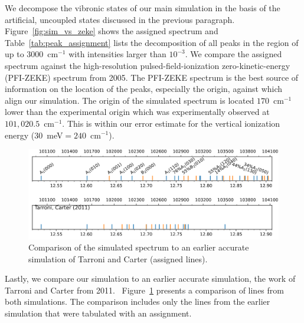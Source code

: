 \documentclass[12pt,a4paper,prb,aps,superscriptaddress]{revtex4}
\begin{document}
We decompose the vibronic states of our main simulation in the basis of the
artificial, uncoupled states discussed in the previous paragraph.
Figure~\ref{fig:sim_vs_zeke} shows the assigned spectrum and
Table~\ref{tab:peak_assignment} lists the decomposition of all peaks in the
region of up to $3000$~cm$^{-1}$ with intensities larger than $10^{-3}$. We
compare the assigned spectrum against the high-resolution
pulsed-field-ionization zero-kinetic-energy (PFI-ZEKE) spectrum from
2005.\cite{Willitsch:O3ZEKE:2005} The PFI-ZEKE spectrum is the best source of
information on the location of the peaks, especially the origin, against which
align our simulation. The origin of the simulated spectrum is located
$170$~cm$^{-1}$ lower than the experimental origin which was experimentally
observed at $101,020.5$~cm$^{-1}$.\cite{Willitsch:O3ZEKE:2005} This is within
our error estimate for the vertical ionization energy
($30$~meV$=240$~cm$^{-1}$).  

\begin{figure}
    \includegraphics[width=16 cm]{figures/sim_vs_TarroniCarter}
    \caption{
        Comparison of the simulated spectrum to an earlier accurate simulation
        of Tarroni and Carter (assigned lines).~\cite{tarroni:O3:2011}
    }
    \label{fig:sim_vs_tarronicarter}
\end{figure}

Lastly, we compare our simulation to an earlier accurate simulation, the work
of Tarroni and Carter from 2011.~\cite{tarroni:O3:2011}
Figure~\ref{fig:sim_vs_tarronicarter} presents a comparison of lines from both
simulations. The comparison includes only the lines from the earlier
simulation that were tabulated with an assignment. 
\end{document}
